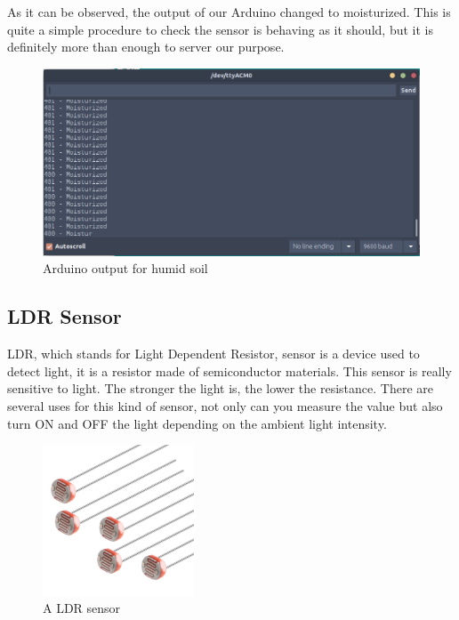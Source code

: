 As it can be observed, the output of our Arduino changed to moisturized. This is quite a simple procedure to check the sensor is behaving as it should, but it is definitely more than enough to server our purpose.

\begin{figure}[H]
    \centering
    \includegraphics[width=1\textwidth]{fig/humedo.png}
    \caption{Arduino output for humid soil}
    \label{fig:humid-soil}
\end{figure}

\newpage
\subsection{LDR Sensor}
LDR\cite{ldr}, which stands for Light Dependent Resistor, sensor is a device used to detect light, it is a resistor made of semiconductor materials. This sensor is really sensitive to light. The stronger the light is, the lower the resistance. There are several uses for this kind of sensor, not only can you measure the value but also turn ON and OFF the light depending on the ambient light intensity.

\begin{figure}[H]
    \centering
    \includegraphics[width=0.4\textwidth]{fig/ldr.jpg}
    \caption{A LDR sensor}
    \label{fig:ldr}
\end{figure}

